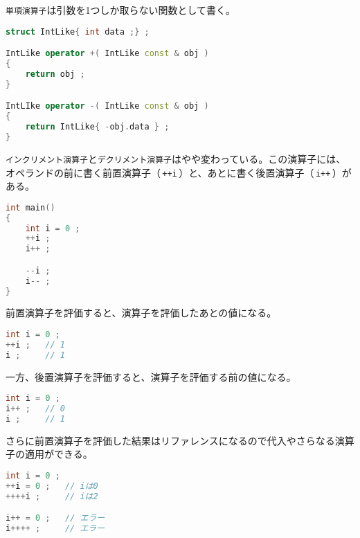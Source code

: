 \texttt{単項演算子}は引数を1つしか取らない関数として書く。

\begin{lstlisting}[language={C++}]
struct IntLike{ int data ;} ;

IntLike operator +( IntLike const & obj )
{
    return obj ;
}

IntLIke operator -( IntLike const & obj )
{
    return IntLike{ -obj.data } ;
}
\end{lstlisting}

\clearpage
{}

\texttt{インクリメント演算子}と\texttt{デクリメント演算子}はやや変わっている。この演算子には、オペランドの前に書く前置演算子（\,\texttt{++i}\,）と、あとに書く後置演算子（\,\texttt{i++}\,）がある。

\begin{lstlisting}[language={C++}]
int main()
{
    int i = 0 ;
    ++i ;
    i++ ;

    --i ;
    i-- ;
}
\end{lstlisting}

前置演算子を評価すると、演算子を評価したあとの値になる。

\begin{lstlisting}[language={C++}]
int i = 0 ;
++i ;   // 1
i ;     // 1
\end{lstlisting}

一方、後置演算子を評価すると、演算子を評価する前の値になる。

\begin{lstlisting}[language={C++}]
int i = 0 ;
i++ ;   // 0
i ;     // 1
\end{lstlisting}

さらに前置演算子を評価した結果はリファレンスになるので代入やさらなる演算子の適用ができる。

\begin{lstlisting}[language={C++}]
int i = 0 ;
++i = 0 ;   // iは0
++++i ;     // iは2

i++ = 0 ;   // エラー
i++++ ;     // エラー
\end{lstlisting}


